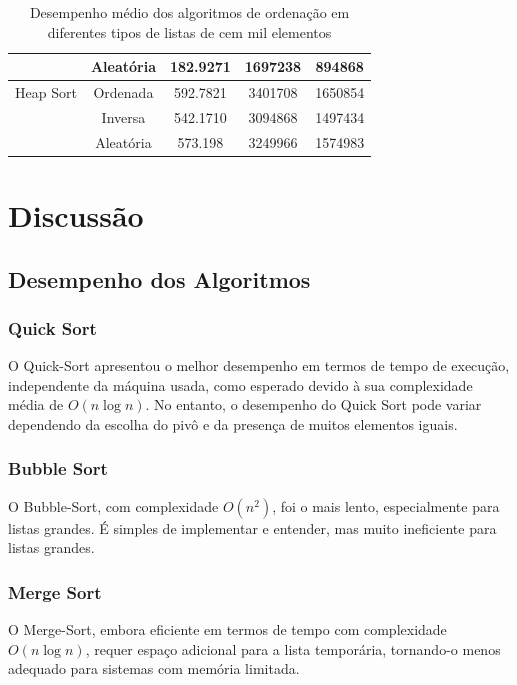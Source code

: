 \documentclass[tcc2]{uftex}
\begin{document}
\begin{table}[h!]
\begin{tabular}{|l|c|c|c|c|}
                   & Aleatória               & 182.9271                 & 1697238                 & 894868    \\ \hline
Heap Sort         & Ordenada                & 592.7821                 & 3401708                 & 1650854    \\ \cline{2-5}
                   & Inversa                 & 542.1710                 & 3094868                 & 1497434    \\ \cline{2-5}
                   & Aleatória               & 573.198                 & 3249966                 & 1574983    \\ \hline
\end{tabular}
\caption{Desempenho médio dos algoritmos de ordenação em diferentes tipos de listas de cem mil elementos}
\label{tab:sorting_algorithms}
\end{table}



\chapter{Discussão}

\section{Desempenho dos Algoritmos}

\subsection{Quick Sort}
O Quick-Sort apresentou o melhor desempenho em termos de tempo de execução, independente da máquina usada, como esperado devido à sua complexidade média de $O(n \log n)$. No entanto, o desempenho do Quick Sort pode variar dependendo da escolha do pivô e da presença de muitos elementos iguais.

\subsection{Bubble Sort}
O Bubble-Sort, com complexidade $O(n^2)$, foi o mais lento, especialmente para listas grandes. É simples de implementar e entender, mas muito ineficiente para listas grandes.

\subsection{Merge Sort}
O Merge-Sort, embora eficiente em termos de tempo com complexidade $O(n \log n)$, requer espaço adicional para a lista temporária, tornando-o menos adequado para sistemas com memória limitada.
\end{document}
